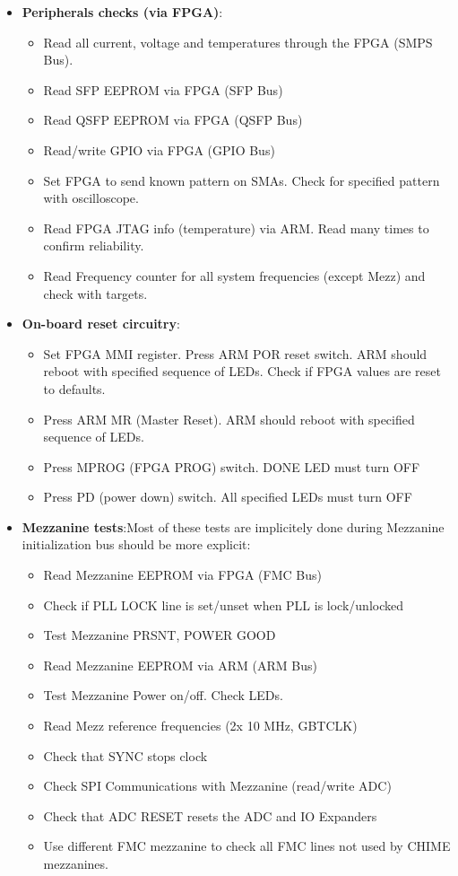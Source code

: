 \documentclass[11pt,article]{memoir}
\begin{document}
\begin{itemize}
\item \textbf{Peripherals checks (via FPGA)}:
	\begin{itemize}

	\item Read all current, voltage and temperatures through the FPGA (SMPS Bus).
	\item Read SFP EEPROM via FPGA (SFP Bus)
	\item Read QSFP EEPROM via FPGA (QSFP Bus)
	\item Read/write GPIO via FPGA (GPIO Bus)
	\item Set FPGA to send known pattern on SMAs. Check for specified pattern with oscilloscope.
	\item Read FPGA JTAG info (temperature) via ARM. Read many times to confirm reliability.
	\item Read Frequency counter for all system frequencies (except Mezz) and check with targets.
	\end{itemize}

\item \textbf{On-board reset circuitry}:
	\begin{itemize}
	 \item Set FPGA MMI register. Press ARM POR reset switch. ARM should reboot with specified sequence of LEDs. Check if FPGA values are reset to defaults.
	 \item Press ARM MR (Master Reset). ARM should reboot with specified sequence of LEDs.
	 \item Press MPROG (FPGA PROG) switch. DONE LED must turn OFF
	 \item Press PD (power down) switch. All specified LEDs must turn OFF
	\end{itemize}

\item \textbf{Mezzanine tests}:Most of these tests are implicitely done during Mezzanine initialization bus should be more explicit:
	\begin{itemize}
	\item Read Mezzanine EEPROM via FPGA (FMC Bus)
	\item Check if PLL LOCK line is set/unset when PLL is lock/unlocked
	\item Test Mezzanine PRSNT, POWER GOOD
	\item Read Mezzanine EEPROM via ARM (ARM Bus)
	\item Test Mezzanine Power on/off. Check LEDs.
	\item Read Mezz reference frequencies (2x 10 MHz, GBTCLK)
	\item Check that SYNC stops clock
	\item Check SPI Communications with Mezzanine (read/write ADC)
	\item Check that ADC RESET resets the ADC and IO Expanders
	\item Use different FMC mezzanine to check all FMC lines not used by CHIME mezzanines.
	\end{itemize}


\end{itemize}
\end{document}
